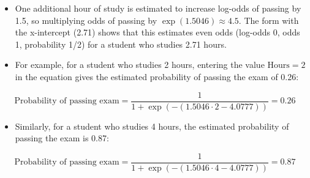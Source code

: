 \documentclass[11pt,dvipsnames,ignorenonframetext,aspectratio=169]{beamer}
\providecommand{\tightlist}{%
  \setlength{\itemsep}{0pt}\setlength{\parskip}{0pt}}
\begin{document}
\begin{frame}{}
\protect\hypertarget{section-9}{}
\begin{itemize}
\item
  One additional hour of study is estimated to increase log-odds of
  passing by 1.5, so multiplying odds of passing by
  \({\displaystyle \exp(1.5046)\approx 4.5.}\) The form with the
  x-intercept (2.71) shows that this estimates even odds (log-odds 0,
  odds 1, probability 1/2) for a student who studies 2.71 hours.
\item
  For example, for a student who studies 2 hours, entering the value
  \({\displaystyle {\text{Hours}}=2}\) in the equation gives the
  estimated probability of passing the exam of 0.26:
\end{itemize}

\[{\displaystyle {\text{Probability of passing exam}}={\frac {1}{1+\exp \left(-\left(1.5046\cdot 2-4.0777\right)\right)}}=0.26}\]

\begin{itemize}
\tightlist
\item
  Similarly, for a student who studies 4 hours, the estimated
  probability of passing the exam is 0.87:
\end{itemize}

\[{\displaystyle {\text{Probability of passing exam}}={\frac {1}{1+\exp \left(-\left(1.5046\cdot 4-4.0777\right)\right)}}=0.87}\]
\end{frame}
\end{document}
